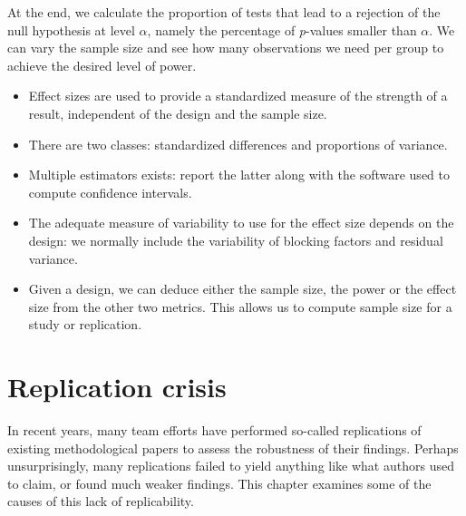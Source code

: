 \documentclass[
  11pt,
  letterpaper,
]{scrbook}
\providecommand{\tightlist}{%
  \setlength{\itemsep}{0pt}\setlength{\parskip}{0pt}}\usepackage{longtable,booktabs,array}
\theoremstyle{definition}
\theoremstyle{remark}
\begin{document}
At the end, we calculate the proportion of tests that lead to a
rejection of the null hypothesis at level \(\alpha\), namely the
percentage of \emph{p}-values smaller than \(\alpha\). We can vary the
sample size and see how many observations we need per group to achieve
the desired level of power.

\begin{tcolorbox}[enhanced jigsaw, colback=white, coltitle=black, rightrule=.15mm, left=2mm, bottomrule=.15mm, toprule=.15mm, titlerule=0mm, colframe=quarto-callout-important-color-frame, leftrule=.75mm, title=\textcolor{quarto-callout-important-color}{\faExclamation}\hspace{0.5em}{\textbf{Summary}}, breakable, arc=.35mm, colbacktitle=quarto-callout-important-color!10!white, opacitybacktitle=0.6, opacityback=0, toptitle=1mm, bottomtitle=1mm]

\begin{itemize}
\tightlist
\item
  Effect sizes are used to provide a standardized measure of the
  strength of a result, independent of the design and the sample size.
\item
  There are two classes: standardized differences and proportions of
  variance.
\item
  Multiple estimators exists: report the latter along with the software
  used to compute confidence intervals.
\item
  The adequate measure of variability to use for the effect size depends
  on the design: we normally include the variability of blocking factors
  and residual variance.
\item
  Given a design, we can deduce either the sample size, the power or the
  effect size from the other two metrics. This allows us to compute
  sample size for a study or replication.
\end{itemize}

\end{tcolorbox}


\hypertarget{replication-crisis}{%
\chapter{Replication crisis}\label{replication-crisis}}

In recent years, many team efforts have performed so-called replications
of existing methodological papers to assess the robustness of their
findings. Perhaps unsurprisingly, many replications failed to yield
anything like what authors used to claim, or found much weaker findings.
This chapter examines some of the causes of this lack of replicability.
\end{document}
